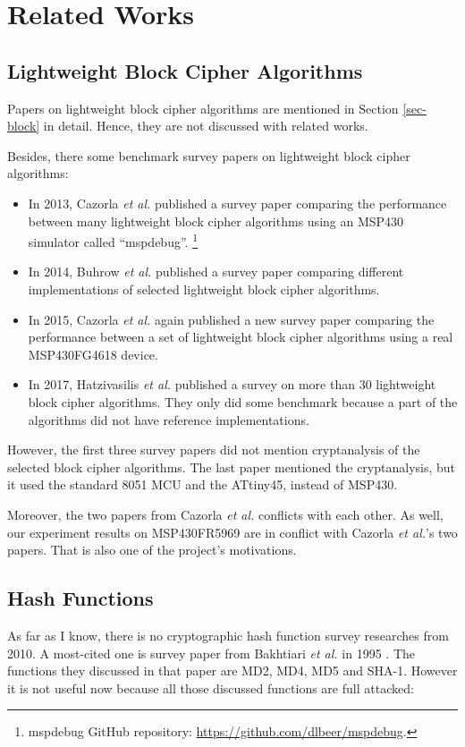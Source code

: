 \documentclass[sigconf, review=false]{acmart}
\begin{document}
\section{Related Works}
\subsection{Lightweight Block Cipher Algorithms}
Papers on lightweight block cipher algorithms are mentioned in Section \ref{sec-block} in detail.
Hence, they are not discussed with related works.

Besides, there some benchmark survey papers on lightweight block cipher algorithms:

\begin{itemize}
    \item In 2013, Cazorla \textit{et al.} published a survey paper comparing the performance between
          many lightweight block cipher algorithms using an MSP430 simulator called ``mspdebug''.
          \footnote{mspdebug GitHub repository: \url{https://github.com/dlbeer/mspdebug}.} \cite{cazorla2013survey}
    \item In 2014, Buhrow \textit{et al.} published a survey paper comparing different implementations
          of selected lightweight block cipher algorithms. \cite{buhrow2014block}
    \item In 2015, Cazorla \textit{et al.} again published a new survey paper comparing the performance between
          a set of lightweight block cipher algorithms using a real MSP430FG4618 device. \cite{cazorla2015survey}
    \item In 2017, Hatzivasilis \textit{et al.} published a survey on more than 30 lightweight block cipher algorithms.
          They only did some benchmark because a part of the algorithms did not have reference implementations. \cite{hatzivasilis2017review}
\end{itemize}

However, the first three survey papers did not mention cryptanalysis of the selected block cipher algorithms.
The last paper mentioned the cryptanalysis, but it used the standard 8051 MCU and the ATtiny45, instead of MSP430.

Moreover, the two papers from Cazorla \textit{et al.} conflicts with each other.
As well, our experiment results on MSP430FR5969 are in conflict with Cazorla \textit{et al.}'s two papers.
That is also one of the project's motivations.

\subsection{Hash Functions}
As far as I know, there is no cryptographic hash function survey researches from 2010.
A most-cited one is survey paper from Bakhtiari \textit{et al.} in 1995 \cite{bakhtiari1995cryptographic}.
The functions they discussed in that paper are MD2, MD4, MD5 and SHA-1.
However it is not useful now because all those discussed functions are full attacked:
\end{document}
